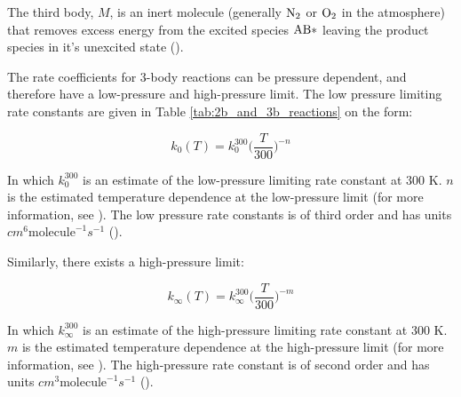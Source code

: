 The third body, $M$, is an inert molecule (generally $\mathrm{N_2}$ or $\mathrm{O_2}$ in the atmosphere) that removes excess energy from the excited species $\mathrm{AB*}$ leaving the product species  in it's unexcited state (\cite{Jacob1999}).


\medskip





The rate coefficients for 3-body reactions can be pressure dependent, and therefore have a low-pressure and high-pressure limit. The low pressure limiting rate constants are given in Table \ref{tab:2b_and_3b_reactions} on the form: 

\begin{equation}
    k_0(T) = k_0^{300}\Big(\frac{T}{300}\Big)^{-n}    
    \label{eq:3b_low_pressure}
\end{equation}

In which $k_0^{300}$ is an estimate of the low-pressure limiting rate constant at 300 K. $n$ is the estimated temperature dependence at the low-pressure limit (for more information, see \cite{JPL}). The low pressure rate constants is of third order and has units $cm^6\text{molecule}^{-1}s^{-1}$ (\cite{AtmModFund}).

\medskip

Similarly, there exists a high-pressure limit:

\begin{equation}
    k_\infty(T) = k_\infty^{300}\Big(\frac{T}{300}\Big)^{-m}
    \label{eq:3b_high_pressure}
\end{equation}

In which $k_\infty^{300}$ is an estimate of the high-pressure limiting rate constant at 300 K. $m$ is the estimated temperature dependence at the high-pressure limit (for more information, see \cite{JPL}). The high-pressure rate constant is of second order and has units $cm^3\text{molecule}^{-1}s^{-1}$ (\cite{AtmModFund}).


